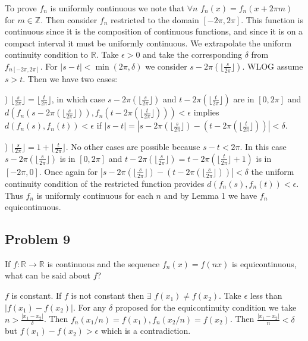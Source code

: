 \documentclass{amsart}
\begin{document}
\medskip \noindent To prove $f_n$ is uniformly continuous we note that $\forall n$ $f_n(x)= f_n(x+2\pi m)$ for $m\in \mathbb{Z}$. Then consider $f_n$ restricted to the 
domain $[-2\pi, 2\pi]$. This function is continuous since it is the composition of continuous functions, and since it is
on a compact interval it must be uniformly continuous. We extrapolate the uniform continuity condition to $\mathbb{R}$. Take $\epsilon>0$ and 
take the corresponding $\delta$ from $f_{n[-2\pi, 2\pi]}$. For $|s-t|<\min(2\pi, \delta)$ we consider $s-2\pi(\lfloor \frac{s}{2\pi}\rfloor)$. WLOG assume $s>t$. Then we have two cases:

\medskip {}) $\lfloor \frac{s}{2\pi}\rfloor = \lfloor \frac{t}{2\pi}\rfloor$, in which case $s-2\pi(\lfloor \frac{s}{2\pi}\rfloor)$ and $t-2\pi(\lfloor \frac{t}{2\pi}\rfloor)$ are in $[0, 2\pi]$ and 
$d(f_n(s-2\pi(\lfloor \frac{s}{2\pi}\rfloor)), f_n(t-2\pi(\lfloor \frac{t}{2\pi}\rfloor)))<\epsilon$ implies $d(f_n(s), f_n(t))<\epsilon$ if $|s-t|=|s-2\pi(\lfloor \frac{s}{2\pi}\rfloor)-(t-2\pi(\lfloor \frac{t}{2\pi}\rfloor))|<\delta$. 

\medskip {}) $\lfloor \frac{s}{2\pi}\rfloor = 1+\lfloor \frac{t}{2\pi}\rfloor$. No other cases are possible because $s-t<2\pi$. In this case $s-2\pi(\lfloor \frac{s}{2\pi}\rfloor)$ is in $[0, 2\pi]$
and $t-2\pi(\lfloor \frac{s}{2\pi}\rfloor)=t-2\pi(\lfloor \frac{t}{2\pi}\rfloor+1)$ is in $[-2\pi, 0]$. Once again for $|s-2\pi(\lfloor \frac{s}{2\pi}\rfloor)-(t-2\pi(\lfloor \frac{s}{2\pi}\rfloor))|<\delta$ the uniform
continuity condition of the restricted function provides $d(f_n(s), f_n(t))<\epsilon$. Thus $f_n$ is uniformly continuous for each $n$ and by Lemma 1 we 
have $f_n$ equicontinuous.

\newpage

\subsection*{Problem 9} If \( f : \mathbb{R} \to \mathbb{R} \) is continuous and the sequence \( f_n(x) = f(nx) \) is equicontinuous, what can be said about \( f \)?

\medskip \noindent $f$ is constant. If $f$ is not constant then $\exists$ $f(x_1)\neq f(x_2)$. Take $\epsilon$ less than $|f(x_1)-f(x_2)|$. For any $\delta$
proposed for the equicontinuity condition we take $n> \frac{|x_1-x_2|}{\delta}$. Then $f_n(x_1/n)=f(x_1), f_n(x_2/n)=f(x_2)$. Then $\frac{|x_1-x_2|}{n}<\delta$ but 
$f(x_1)-f(x_2)>\epsilon$ which is a contradiction.
\end{document}
